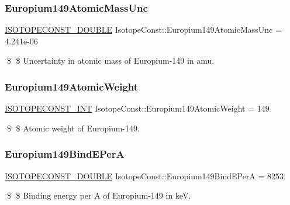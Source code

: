 \subsubsection{\texorpdfstring{Europium149\+Atomic\+Mass\+Unc}{Europium149AtomicMassUnc}}
{\footnotesize\ttfamily \mbox{\hyperlink{group___isotope_const-_macros_ga8f45a7272ce02c0b4c65c44636ed719a}{I\+S\+O\+T\+O\+P\+E\+C\+O\+N\+S\+T\+\_\+\+D\+O\+U\+B\+LE}} Isotope\+Const\+::\+Europium149\+Atomic\+Mass\+Unc = 4.\+241e-\/06}

\$ \$ Uncertainty in atomic mass of Europium-\/149 in amu. \mbox{\label{group___isotope_const-_europium-_eu149_ga9e164475c12a170a08156fd6e6950033}} 
\subsubsection{\texorpdfstring{Europium149\+Atomic\+Weight}{Europium149AtomicWeight}}
{\footnotesize\ttfamily \mbox{\hyperlink{group___isotope_const-_macros_ga5f18360b3e99483a35c32d789e62621c}{I\+S\+O\+T\+O\+P\+E\+C\+O\+N\+S\+T\+\_\+\+I\+NT}} Isotope\+Const\+::\+Europium149\+Atomic\+Weight = 149}

\$ \$ Atomic weight of Europium-\/149. \mbox{\label{group___isotope_const-_europium-_eu149_ga68c908ff9477b7fb03a73c0a13467168}} 
\subsubsection{\texorpdfstring{Europium149\+Bind\+E\+PerA}{Europium149BindEPerA}}
{\footnotesize\ttfamily \mbox{\hyperlink{group___isotope_const-_macros_ga8f45a7272ce02c0b4c65c44636ed719a}{I\+S\+O\+T\+O\+P\+E\+C\+O\+N\+S\+T\+\_\+\+D\+O\+U\+B\+LE}} Isotope\+Const\+::\+Europium149\+Bind\+E\+PerA = 8253.}

\$ \$ Binding energy per A of Europium-\/149 in keV. \mbox{\label{group___isotope_const-_europium-_eu149_ga1d520ceb3e49e485c57691999a5e1fcc}} 
